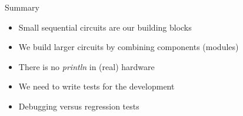 \begin{frame}[fragile]{Summary}
\begin{itemize}
\item Small sequential circuits are our building blocks
\item We build larger circuits by combining components (modules)
\item There is no \emph{println} in (real) hardware
\item We need to write tests for the development
\item Debugging versus regression tests
\end{itemize}
\end{frame}




